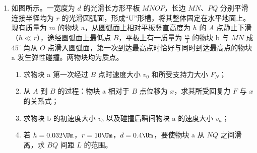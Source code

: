 \documentclass[\gkver]{gaokaozhenti}
\begin{document}
\begin{enumerate}
{$cd$ 向下弯曲，使 $R_{2}$ 被压缩（阻值减小）、$R_{4}$ 被拉伸（阻值增大），故 $R_{2}=R_{0}-\Delta R$，$R_{4}=R_{0}+\Delta R$

（3）由图可知 $R_{1}$ 与 $R_{2}$ 串联，$R_{3}$ 与 $R_{4}$ 串联，两条支路并联。

上支路总电阻为 $R_{\text{上}}=R_{1}+R_{2}=(R_{0}+\Delta R)+(R_{0}-\Delta R)=2R_{0}$

电流 $I_{\text{上}}=\frac{E}{2R_{0}}$

$f$ 点电势 $\varphi_{f}=I_{\text{上}}R_{2}=\frac{E(R_{0}-\Delta R)}{2R_{0}}$

下支路总电阻为 $R_{\text{下}}=R_{3}+R_{4}=(R_{0}-\Delta R)+(R_{0}+\Delta R)=2R_{0}$

电流 $I_{\text{下}}=\frac{E}{2R_{0}}$

$e$ 点电势 $\varphi_{e}=I_{\text{下}}R_{4}=\frac{E(R_{0}+\Delta R)}{2R_{0}}$

$e$、$f$ 两点间的电势差绝对值 $U_{ef}=\varphi_{e}-\varphi_{f}=\frac{E\Delta R}{R_{0}}$

安培力与 $\Delta R$ 的关系：$\Delta R = \alpha F$，而 $F = BI_{0}l$，所以 $\Delta R = \alpha BI_{0}l$

联立得 $B = \frac{R_{0}U_{ef}}{\alpha EI_{0}l}$
}

\item
如图所示。一宽度为 $d$ 的光滑长方形平板 $MNOP$，长边 $MN$、$PQ$ 分别平滑连接半径均为 $r$ 的光滑圆弧面，形成“U”形槽，将其整体固定在水平地面上。现有质量为 $m$ 的物块 a，从圆弧面上相对平板竖直高度为 $h$ 的 $A$ 点静止下滑（$h \ll r$），途经圆弧面上最低点 $B$，平板上有一质量为 $\frac{m}{3}$ 的物块 b 与 $MN$ 成 $45^{\circ}$ 角从 $O$ 点滑入圆弧面，第一次到达最高点时恰好与同时到达最高点的物块 a 发生弹性碰撞。两物块均为质点。
\begin{enumerate}
	\item
	求物块 a 第一次经过 $B$ 点时速度大小 $v_{0}$ 和所受支持力大小 $F_{N}$；
	\item
	从 $A$ 到 $B$ 的过程：物块 a 相对于 $B$ 点位移为 $x$，求其所受回复力 $F$ 与 $x$ 的关系式；
	\item
	求物块 b 的初速度大小 $v_{b}$ 以及碰撞后瞬间物块 a 的速度大小 $v_{a}$；
	\item
	若 $h = 0.032\Um$，$r = 10\Um$，$d = 0.4\Um$，要使物块 a 从 $NQ$ 之间滑离，求 $BQ$ 间距 $L$ 的范围。
\end{enumerate}
\end{enumerate}
\end{document}
